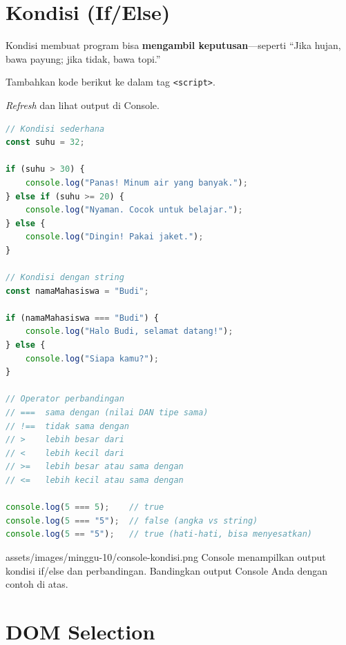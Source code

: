 \section{Kondisi (If/Else)}
\label{sec:10-kondisi}

Kondisi membuat program bisa \textbf{mengambil keputusan}---seperti ``Jika hujan, bawa payung; jika tidak, bawa topi.''

\begin{langkah}
  \item Tambahkan kode berikut ke dalam tag \texttt{<script>}.
  \item \emph{Refresh} dan lihat output di Console.
\end{langkah}

\begin{lstlisting}[language=JavaScript, caption={Percabangan if/else dan operator perbandingan}, label={lst:10-kondisi}]
// Kondisi sederhana
const suhu = 32;

if (suhu > 30) {
    console.log("Panas! Minum air yang banyak.");
} else if (suhu >= 20) {
    console.log("Nyaman. Cocok untuk belajar.");
} else {
    console.log("Dingin! Pakai jaket.");
}

// Kondisi dengan string
const namaMahasiswa = "Budi";

if (namaMahasiswa === "Budi") {
    console.log("Halo Budi, selamat datang!");
} else {
    console.log("Siapa kamu?");
}

// Operator perbandingan
// ===  sama dengan (nilai DAN tipe sama)
// !==  tidak sama dengan
// >    lebih besar dari
// <    lebih kecil dari
// >=   lebih besar atau sama dengan
// <=   lebih kecil atau sama dengan

console.log(5 === 5);    // true
console.log(5 === "5");  // false (angka vs string)
console.log(5 == "5");   // true (hati-hati, bisa menyesatkan)
\end{lstlisting}

\begin{tangkapanlayar}
  {assets/images/minggu-10/console-kondisi.png}
  {Console menampilkan output kondisi if/else dan perbandingan.}
  {Bandingkan output Console Anda dengan contoh di atas.}
\end{tangkapanlayar}

\section{DOM Selection}
\label{sec:10-dom}

